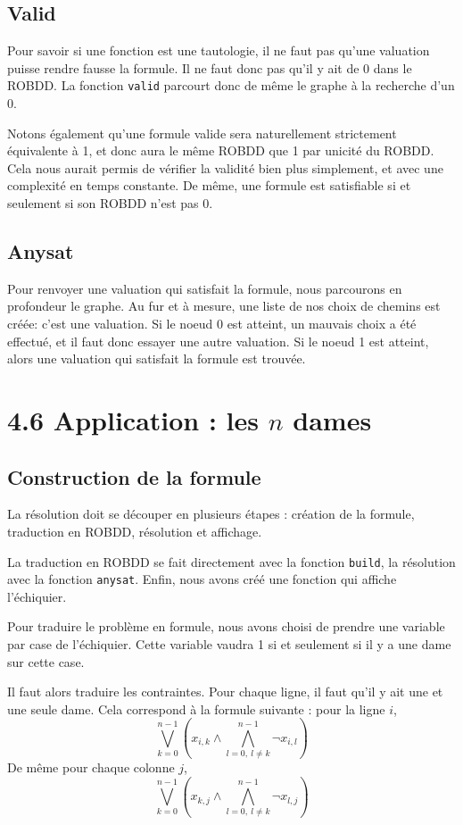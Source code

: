 \documentclass[12pt]{article}
\def\code#1{\texttt{#1}}
\begin{document}
\subsection*{Valid}
Pour savoir si une fonction est une tautologie, il ne faut pas qu'une valuation puisse rendre fausse la formule. Il ne faut donc pas qu'il y ait de 0 dans le ROBDD. La fonction \code{valid} parcourt donc de même le graphe à la recherche d'un 0.

Notons également qu'une formule valide sera naturellement strictement équivalente à 1, et donc aura le même ROBDD que 1 par unicité du ROBDD. Cela nous aurait permis de vérifier la validité bien plus simplement, et avec une complexité en temps constante. De même, une formule est satisfiable si et seulement si son ROBDD n'est pas 0.

\subsection*{Anysat}
Pour renvoyer une valuation qui satisfait la formule, nous parcourons en profondeur le graphe. Au fur et à mesure, une liste de nos choix de chemins est créée: c'est une valuation. Si le noeud 0 est atteint, un mauvais choix a été effectué, et il faut donc essayer une autre valuation. Si le noeud 1 est atteint, alors une valuation qui satisfait la formule est trouvée.

\section*{4.6 Application : les $n$ dames}

\subsection*{Construction de la formule}
La résolution doit se découper en plusieurs étapes : création de la formule, traduction en ROBDD, résolution et affichage.

La traduction en ROBDD se fait directement avec la fonction \code {build}, la résolution avec la fonction \code{anysat}. Enfin, nous avons créé une fonction qui affiche l'échiquier.

Pour traduire le problème en formule, nous avons choisi de prendre une variable par case de l'échiquier. Cette variable vaudra 1 si et seulement si il y a une dame sur cette case.

Il faut alors traduire les contraintes. Pour chaque ligne, il faut qu'il y ait une et une seule dame. Cela correspond à la formule suivante :
pour la ligne $i$,
$$\bigvee_{k=0}^{n-1} \left( x_{i,k}\wedge\bigwedge_{l=0,\ l\neq k}^{n-1} \neg x_{i,l}\right)$$
De même pour chaque colonne $j$,
$$\bigvee_{k=0}^{n-1} \left( x_{k,j}\wedge\bigwedge_{l=0,\ l\neq k}^{n-1} \neg x_{l,j}\right)$$
\end{document}
